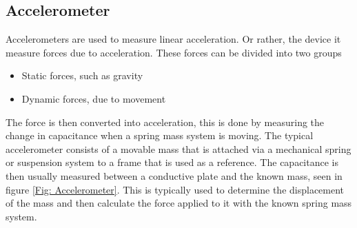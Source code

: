 \documentclass[a4paper,11pt]{kth-mag}
\begin{document}
\subsection{Accelerometer}
Accelerometers are used to measure linear acceleration. Or rather, the device it measure forces due to acceleration. These forces can be divided into two groups 
\begin{itemize}
\item Static forces, such as gravity
\item Dynamic forces, due to movement
\end{itemize}
The force is then converted into acceleration, this is done by measuring the change in capacitance when a spring mass system is moving. The typical accelerometer consists of a movable mass that is attached via a mechanical spring or suspension system to a frame that is used as a reference. 
The capacitance is then usually measured between a conductive plate and the known mass, seen in figure \ref{Fig: Accelerometer}. This is typically used to determine the displacement of the mass and then calculate the force applied to it with the known spring mass system.
\end{document}
